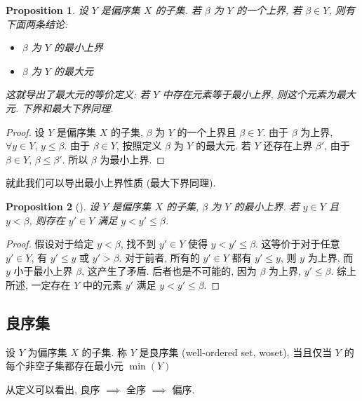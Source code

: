 \documentclass[UTF8]{ctexart}
\theoremstyle{mystyle}
\newtheorem{proposition}{Proposition}[section]
\theoremstyle{myremark}
\theoremstyle{plain}
\begin{document}
\begin{proposition}
    设 $ Y $ 是偏序集 $ X $ 的子集. 若 $ \beta $ 为 $ Y $ 的一个上界, 若 $ \beta \in Y $, 则有下面两条结论:
    \begin{itemize}
        \item $ \beta $ 为 $ Y $ 的最小上界
        \item $ \beta $ 为 $ Y $ 的最大元
    \end{itemize}

    这就导出了最大元的等价定义: 若 $ Y $ 中存在元素等于最小上界, 则这个元素为最大元. 下界和最大下界同理.
\end{proposition}

\begin{proof}
    设 $ Y $ 是偏序集 $ X $ 的子集, $ \beta $ 为 $ Y $ 的一个上界且 $ \beta \in Y $. 由于 $ \beta $ 为上界, $ \forall y \in Y $, $ y \le \beta $. 由于 $ \beta \in Y $, 按照定义 $ \beta $ 为 $ Y $ 的最大元. 若 $ Y $ 还存在上界 $ \beta' $, 由于 $ \beta \in Y $, $ \beta \le \beta' $. 所以 $ \beta $ 为最小上界.
\end{proof}

就此我们可以导出最小上界性质 (最大下界同理).

\begin{proposition}[]
    设 $ Y $ 是偏序集 $ X $ 的子集, $ \beta $ 为 $ Y $ 的最小上界. 若 $ y \in Y $ 且 $ y < \beta $, 则存在 $ y' \in Y $ 满足 $ y < y' \le \beta $.
\end{proposition}

\begin{proof}
    假设对于给定 $ y < \beta $, 找不到 $ y' \in Y $ 使得 $ y < y' \le \beta $. 这等价于对于任意 $ y' \in Y $, 有 $ y' \le y $ 或 $ y' > \beta $. 对于前者, 所有的 $ y' \in Y $ 都有 $ y' \le y $, 则 $ y $ 为上界, 而 $ y $ 小于最小上界 $ \beta $, 这产生了矛盾. 后者也是不可能的, 因为 $ \beta $ 为上界, $ y' \le \beta $. 综上所述, 一定存在 $ Y $ 中的元素 $ y' $ 满足 $ y < y' \le \beta $.
\end{proof}


\subsection{良序集}
\begin{definition}
    设 $ Y $ 为偏序集 $ X $ 的子集. 称 $ Y $ 是良序集 (well-ordered set, woset), 当且仅当 $ Y $ 的每个非空子集都存在最小元 $ \min(Y) $
\end{definition}

从定义可以看出, 良序 $ \implies $ 全序 $ \implies $ 偏序.
\end{document}

